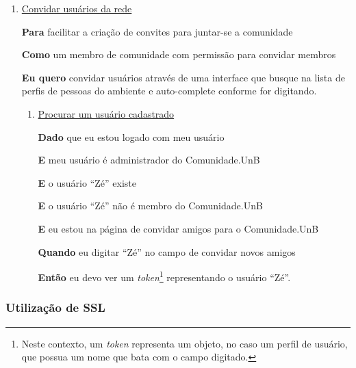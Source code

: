 
\begin{enumerate}

\item \underline{Convidar usuários da rede}

	\textbf{Para} facilitar a criação de convites para juntar-se a comunidade

	\textbf{Como} um membro de comunidade com permissão para convidar membros

	\textbf{Eu quero} convidar usuários através de uma interface que busque na lista
	de perfis de pessoas do ambiente e auto-complete conforme for digitando.


	\begin{enumerate}

		\item \underline{Procurar um usuário cadastrado}

		\textbf{Dado} que eu estou logado com meu usuário

		\textbf{E} meu usuário é administrador do Comunidade.UnB

		\textbf{E} o usuário ``Zé'' existe

		\textbf{E} o usuário ``Zé'' não é membro do Comunidade.UnB

		\textbf{E} eu estou na página de convidar amigos para o Comunidade.UnB

		\textbf{Quando} eu digitar ``Zé'' no campo de convidar novos amigos

		\textbf{Então} eu devo ver um \textit{token}\footnote{Neste contexto, um
		\textit{token} representa um objeto, no caso um perfil de usuário, que possua
		um nome que bata com o campo digitado.} representando o usuário ``Zé''.

	\end{enumerate}


\end{enumerate}


\subsubsection{Utilização de SSL}

